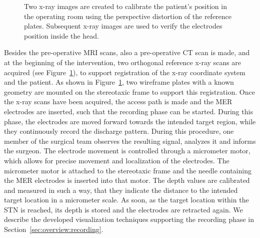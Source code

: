 \documentclass{vgtc}                          %
\begin{document}
\begin{figure}[b]
    \centering
    \hspace*{0.1cm}
    \caption{Two x-ray images are created to calibrate the patient's position in the operating room using the perspective distortion of the reference plates. Subsequent x-ray images are used to verify the electrodes position inside the head.}
    \label{fig:xrayreferencescans}
\end{figure}

Besides the pre-operative MRI scans, also a pre-operative CT scan is made, and at the beginning of the intervention, two orthogonal reference x-ray scans are acquired (see Figure~\ref{fig:xrayreferencescans}), to support registration of the x-ray coordinate system and the patient. As shown in Figure~\ref{fig:xrayreferencescans}, two wireframe plates with a known geometry are mounted on the stereotaxic frame to support this registration. Once the x-ray scans have been acquired, the access path is made and the MER electrodes are inserted, such that the recording phase can be started. During this phase, the electrodes are moved forward towards the intended target region, while they continuously record the discharge pattern. During this procedure, one member of the surgical team observes the resulting signal, analyzes it and informs the surgeon. The electrode movement is controlled through a micrometer motor, which allows for precise movement and localization of the electrodes. The micrometer motor is attached to the stereotaxic frame and the needle containing the MER electrodes is inserted into that motor. The depth values are calibrated and measured in such a way, that they indicate the distance to the intended target location in a micrometer scale. As soon, as the target location within the STN is reached, its depth is stored and the electrodes are retracted again. We describe the developed visualization techniques supporting the recording phase in Section~\ref{sec:overview:recording}.
\end{document}

